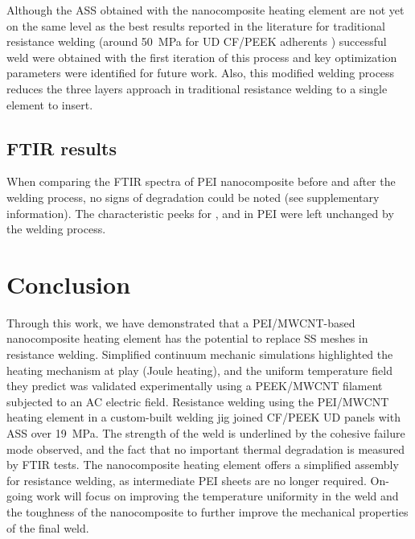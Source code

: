 \documentclass[11pt,review,times]{elsarticle}
\begin{document}
Although the ASS obtained with the nanocomposite heating element are not yet on the same level as the best results reported in the literature for traditional resistance welding (around \SI{50}{\MPa} for UD CF/PEEK adherents \cite{Dube2015}) successful weld were obtained with the first iteration of this process and key optimization parameters were identified for future work. 
Also, this modified welding process reduces the three layers approach in traditional resistance welding to a single element to insert. 

\subsection{FTIR results}

When comparing the FTIR spectra of PEI nanocomposite before and after the welding process, no signs of degradation could be noted (see supplementary information). 
The characteristic peeks for ,  and  in PEI were left unchanged by the welding process. 

\FloatBarrier

							\section{Conclusion}

Through this work, we have demonstrated that a PEI/MWCNT-based nanocomposite heating element has the potential to replace SS meshes in resistance welding. 
Simplified continuum mechanic simulations highlighted the heating mechanism at play (Joule heating), and the uniform temperature field they predict was validated experimentally using a PEEK/MWCNT filament subjected to an AC electric field. 
Resistance welding using the PEI/MWCNT heating element in a custom-built welding jig joined CF/PEEK UD panels with ASS over \SI{19}{\MPa}. 
The strength of the weld is underlined by the cohesive failure mode observed, and the fact that no important thermal degradation is measured by FTIR tests. 
The nanocomposite heating element offers a simplified assembly for resistance welding, as intermediate PEI sheets are no longer required. 
On-going work will focus on improving the temperature uniformity in the weld and the toughness of the nanocomposite to further improve the mechanical properties of the final weld.

\end{document}
